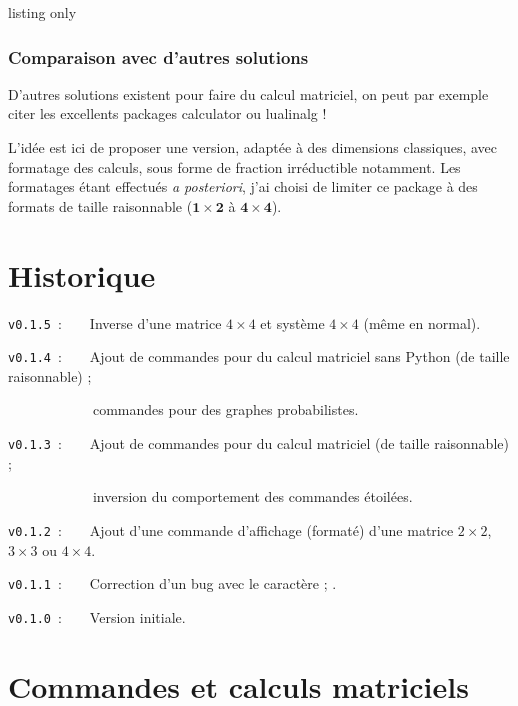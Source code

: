 \documentclass[french,a4paper,11pt]{article}
\begin{document}
\begin{PresentationCode}{listing only}
\usepackage[options]{pyluatex}
\usepackage[pyluatex]{ResolSysteme}
\end{PresentationCode}

\section{Comparaison avec d'autres solutions}

\begin{noteblock}
D'autres solutions existent pour faire du calcul matriciel, on peut par exemple citer les excellents packages \textsf{calculator} ou \textsf{lualinalg} !

\smallskip

L'idée est ici de proposer une version, adaptée à des dimensions classiques, avec formatage des calculs, sous forme de fraction irréductible notamment. Les formatages étant effectués \textit{a posteriori}, j'ai choisi de limiter ce package à des formats de taille raisonnable ($\mathbf{1\times2}$ à $\mathbf{4\times4}$).
\end{noteblock}

\part{Historique}

\verb|v0.1.5|~:~~~~Inverse d'une matrice $4\times4$ et système $4\times4$ (même en normal).

\verb|v0.1.4|~:~~~~Ajout de commandes pour du calcul matriciel sans Python (de taille raisonnable) ;

\verb|      |~~~~~~commandes pour des graphes probabilistes.

\verb|v0.1.3|~:~~~~Ajout de commandes pour du calcul matriciel (de taille raisonnable) ;

\verb|      |~~~~~~inversion du comportement des commandes étoilées.

\verb|v0.1.2|~:~~~~Ajout d'une commande d'affichage (formaté) d'une matrice $2\times2$, $3\times3$ ou $4\times4$.

\verb|v0.1.1|~:~~~~Correction d'un bug avec le caractère \og ; \fg.

\verb|v0.1.0|~:~~~~Version initiale.

\pagebreak

\part{Commandes et calculs matriciels}
\end{document}
